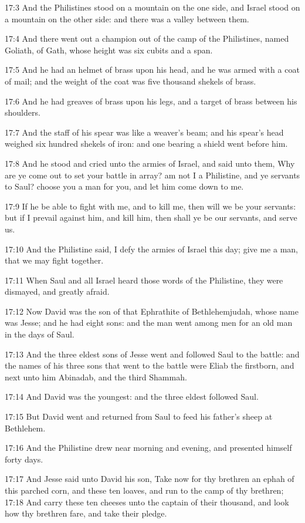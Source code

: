 17:3 And the Philistines stood on a mountain on the one side, and Israel stood on a mountain on the other side: and there was a valley between them.

17:4 And there went out a champion out of the camp of the Philistines, named Goliath, of Gath, whose height was six cubits and a span.

17:5 And he had an helmet of brass upon his head, and he was armed with a coat of mail; and the weight of the coat was five thousand shekels of brass.

17:6 And he had greaves of brass upon his legs, and a target of brass between his shoulders.

17:7 And the staff of his spear was like a weaver's beam; and his spear's head weighed six hundred shekels of iron: and one bearing a shield went before him.

17:8 And he stood and cried unto the armies of Israel, and said unto them, Why are ye come out to set your battle in array? am not I a Philistine, and ye servants to Saul? choose you a man for you, and let him come down to me.

17:9 If he be able to fight with me, and to kill me, then will we be your servants: but if I prevail against him, and kill him, then shall ye be our servants, and serve us.

17:10 And the Philistine said, I defy the armies of Israel this day; give me a man, that we may fight together.

17:11 When Saul and all Israel heard those words of the Philistine, they were dismayed, and greatly afraid.

17:12 Now David was the son of that Ephrathite of Bethlehemjudah, whose name was Jesse; and he had eight sons: and the man went among men for an old man in the days of Saul.

17:13 And the three eldest sons of Jesse went and followed Saul to the battle: and the names of his three sons that went to the battle were Eliab the firstborn, and next unto him Abinadab, and the third Shammah.

17:14 And David was the youngest: and the three eldest followed Saul.

17:15 But David went and returned from Saul to feed his father's sheep at Bethlehem.

17:16 And the Philistine drew near morning and evening, and presented himself forty days.

17:17 And Jesse said unto David his son, Take now for thy brethren an ephah of this parched corn, and these ten loaves, and run to the camp of thy brethren; 17:18 And carry these ten cheeses unto the captain of their thousand, and look how thy brethren fare, and take their pledge.

